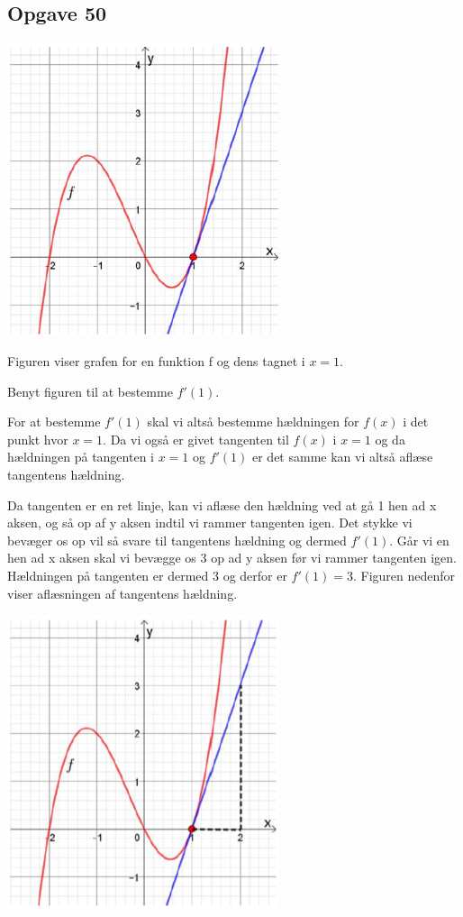 \subsection{Opgave 50}

\includegraphics[width=8cm]{Opgave_41-50/Opgave_50/50.png}

Figuren viser grafen for en funktion f og dens tagnet i $x = 1$.

Benyt figuren til at bestemme $f'(1)$.

\ans

For at bestemme $f'(1)$ skal vi altså bestemme hældningen for $f(x)$ i det punkt hvor $x = 1$. Da vi også er givet tangenten til 
$f(x)$ i $x = 1$ og da hældningen på tangenten i $x = 1$ og $f'(1)$ er det samme kan vi altså aflæse tangentens hældning.

Da tangenten er en ret linje, kan vi aflæse den hældning ved at gå 1 hen ad x aksen, og så op af y aksen indtil vi rammer tangenten igen.
Det stykke vi bevæger os op vil så svare til tangentens hældning og dermed $f'(1)$. Går vi en hen ad x aksen skal vi bevægge os 3 op ad y aksen
før vi rammer tangenten igen. Hældningen på tangenten er dermed 3 og derfor er $f'(1) = 3$. Figuren nedenfor viser aflæsningen af tangentens hældning.

\includegraphics[width=8cm]{Opgave_41-50/Opgave_50/50.1.png}